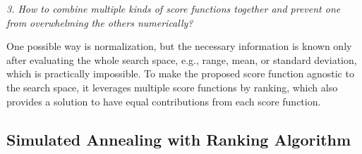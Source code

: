 \documentclass[sigconf]{acmart}
\begin{document}
    \textit{3. How to combine multiple kinds of score functions together 
    and prevent one from overwhelming the others numerically?}
    
    One possible way is normalization, but the necessary information is known only 
    after evaluating the whole search space, e.g., range, mean, or standard deviation, 
    which is practically impossible. To make the proposed score function 
    agnostic to the search space, it leverages multiple score functions by ranking, 
    which also provides a solution to have equal contributions from each score function. 

    \subsection{Simulated Annealing with Ranking Algorithm}
    
\end{document}
